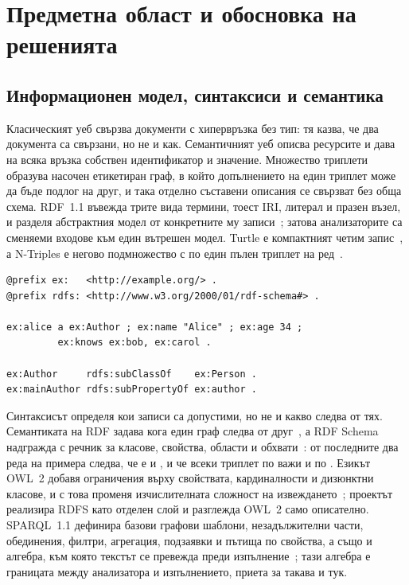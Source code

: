 \section{Предметна област и обосновка на решенията}
\label{sec:literature}

\subsection{Информационен модел, синтаксиси и семантика}

Класическият уеб свързва документи с хипервръзка без тип: тя казва, че два документа са
свързани, но не и как. Семантичният уеб описва ресурсите и дава на всяка връзка собствен
идентификатор и значение. Множество триплети образува насочен етикетиран граф, в който
допълнението на един триплет може да бъде подлог на друг, и така отделно съставени описания се
свързват без обща схема. RDF~1.1 въвежда трите вида термини, тоест IRI, литерал и празен възел,
и разделя абстрактния модел от конкретните му записи~\cite{w3c_rdf11_concepts};
затова анализаторите са сменяеми входове към един вътрешен модел. Turtle е компактният четим
запис~\cite{w3c_turtle}, а N-Triples е негово подмножество с по един пълен триплет на
ред~\cite{w3c_ntriples}.

\begin{lstlisting}[language={},caption={Част от \code{data/small.ttl}}]
@prefix ex:   <http://example.org/> .
@prefix rdfs: <http://www.w3.org/2000/01/rdf-schema#> .

ex:alice a ex:Author ; ex:name "Alice" ; ex:age 34 ;
         ex:knows ex:bob, ex:carol .

ex:Author     rdfs:subClassOf    ex:Person .
ex:mainAuthor rdfs:subPropertyOf ex:author .
\end{lstlisting}

Синтаксисът определя кои записи са допустими, но не и какво следва от тях. Семантиката на RDF
задава кога един граф следва от друг~\cite{w3c_rdf11_semantics}, а RDF Schema надгражда с
речник за класове, свойства, области и обхвати~\cite{w3c_rdf_schema}: от последните два реда на
примера следва, че  е и , и че всеки триплет по
 важи и по . Езикът OWL~2 добавя ограничения върху
свойствата, кардиналности и дизюнктни класове, и с това променя изчислителната сложност на
извеждането~\cite{w3c_owl2_overview}; проектът реализира RDFS като отделен слой и разглежда
OWL~2 само описателно. SPARQL~1.1 дефинира базови графови шаблони, незадължителни части,
обединения, филтри, агрегация, подзаявки и пътища по свойства, а също и алгебра, към която
текстът се превежда преди изпълнение~\cite{w3c_sparql11_query}; тази алгебра е границата между
анализатора и изпълнението, приета за такава и тук.

